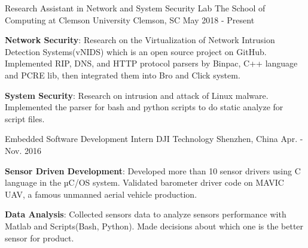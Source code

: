 

\begin{cventries}

  \cventry
    {Research Assistant in Network and System Security Lab} %
    {The School of Computing at Clemson University} %
    {Clemson, SC} %
    {May 2018 - Present} %
    {
      \begin{cvitems} %
        \item   {\textbf{Network Security}: Research on the Virtualization of Network Intrusion Detection Systems(vNIDS) which is an open source project on GitHub. Implemented RIP, DNS, and HTTP protocol parsers by Binpac, C++ language and PCRE lib, then integrated them into Bro and Click system.}
        \item  {\textbf{System Security}: Research on intrusion and attack of Linux malware. Implemented the parser for bash and python scripts to do static analyze for script files.}
      \end{cvitems}
    }

  \cventry
    {Embedded Software Development Intern} %
    {DJI Technology} %
    {Shenzhen, China} %
    {Apr. - Nov. 2016} %
    {
      \begin{cvitems} %
        \item {\textbf{Sensor Driven Development}: Developed more than 10 sensor drivers using C language in the µC/OS system. Validated barometer driver code on MAVIC UAV, a famous unmanned aerial vehicle production.}
        \item {\textbf{Data Analysis}: Collected sensors data to analyze sensors performance with Matlab and Scripts(Bash, Python). Made decisions about which one is the better sensor for product.}
      \end{cvitems}
    }


\end{cventries}
